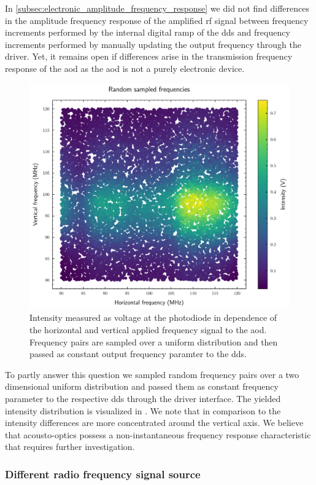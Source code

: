 In \cref{subsec:electronic_amplitude_frequency_response} we did not find
differences in the amplitude frequency response of the amplified \gls{rf}
signal between frequency increments performed by the internal digital ramp of
the \gls{dds} and frequency increments performed by manually updating the
output frequency through the driver. Yet, it remains open if differences
arise in the transmission frequency response of the \gls{aod} as the \gls{aod}
is not a purely electronic device.
\begin{figure}[ht]
  \centering
  \includegraphics[width=.7\textwidth]
  {../figure/intensity/distribution/sample-frequency.pdf}
  \caption{Intensity measured as voltage at the photodiode in dependence of
    the horizontal and vertical applied frequency signal to the \gls{aod}.
    Frequency pairs are sampled over a uniform distribution and then passed
    as constant output frequency paramter to the \gls{dds}.
  }\label{fig:intensity_distribution_frequency_sampled}
\end{figure}
To partly answer this question we sampled random frequency pairs over a
two dimensional uniform distribution and passed them as constant frequency
parameter to the respective \gls{dds} through the driver interface. The
yielded intensity distribution is visualized in
. We note that in
comparison to  the intensity
differences are more concentrated around the vertical axis. We believe that
acousto-optics possess a non-instantaneous frequency response characteristic
that requires further investigation.

\subsubsection{Different radio frequency signal source}

